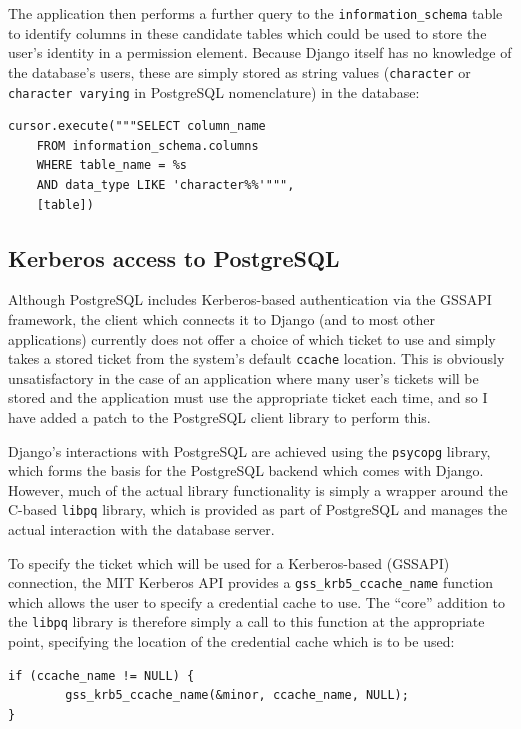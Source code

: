 \documentclass{article}
\begin{document}
The application then performs a further query to the \verb+information_schema+ table to identify columns in these candidate tables which could be used to store the user's identity in a permission element. Because Django itself has no knowledge of the database's users, these are simply stored as string values (\texttt{character} or \texttt{character varying} in PostgreSQL nomenclature) in the database:

\begin{verbatim}
cursor.execute("""SELECT column_name
    FROM information_schema.columns
    WHERE table_name = %s
    AND data_type LIKE 'character%%'""",
    [table])
\end{verbatim}

\subsection{Kerberos access to PostgreSQL}
Although PostgreSQL includes Kerberos-based authentication via the GSSAPI framework\cite{postgres-GSSAPI}, the client which connects it to Django (and to most other applications) currently does not offer a choice of which ticket to use and simply takes a stored ticket from the system's default \texttt{ccache} location. This is obviously unsatisfactory in the case of an application where many user's tickets will be stored and the application must use the appropriate ticket each time, and so I have added a patch to the PostgreSQL client library to perform this.

Django's interactions with PostgreSQL are achieved using the \texttt{psycopg} library, which forms the basis for the PostgreSQL backend which comes with Django. However, much of the actual library functionality is simply a wrapper around the C-based \texttt{libpq} library, which is provided as part of PostgreSQL and manages the actual interaction with the database server.


To specify the ticket which will be used for a Kerberos-based (GSSAPI) connection, the MIT Kerberos API provides a \verb+gss_krb5_ccache_name+ function which allows the user to specify a credential cache to use. The ``core'' addition to the \texttt{libpq} library is therefore simply a call to this function at the appropriate point, specifying the location of the credential cache which is to be used:

\begin{verbatim}
if (ccache_name != NULL) {
        gss_krb5_ccache_name(&minor, ccache_name, NULL);
}
\end{verbatim}
\end{document}
